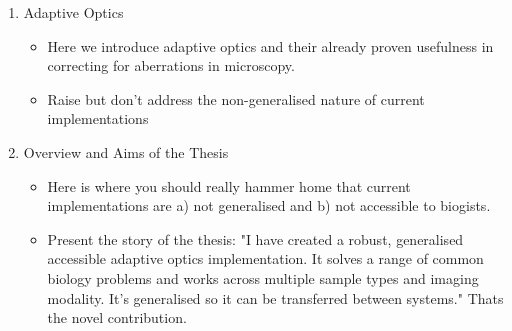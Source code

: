 \documentclass[twoside,onecolumn]{article}
\begin{document}
\begin{enumerate}[label*=\arabic*.]
\begin{enumerate}[label*=\arabic*.]
\begin{itemize}
		\end{itemize}
		\item Adaptive Optics
		\begin{itemize}
			\item Here we introduce adaptive optics and their already proven usefulness in correcting for aberrations in microscopy.
			\item Raise but don't address the non-generalised nature of current implementations
		\end{itemize}
		\item Overview and Aims of the Thesis
		\begin{itemize}
			\item Here is where you should really hammer home that current implementations are a) not generalised and b) not accessible to biogists.
			\item Present the story of the thesis: "I have created a robust, generalised accessible adaptive optics implementation. It solves a range of common biology problems and works across multiple sample types and imaging modality. It's generalised so it can be transferred between systems." Thats the novel contribution.
		\end{itemize}
	\end{enumerate}


\end{enumerate}
\end{document}
